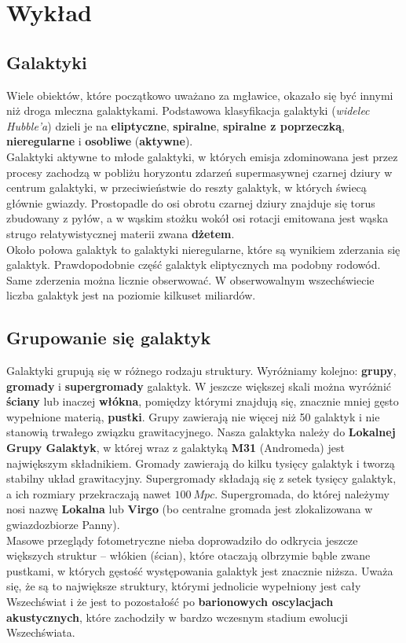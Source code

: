 \documentclass[../index.tex]{subfiles}
\begin{document}
    \section{Wykład}
        \subsection{Galaktyki}
            Wiele obiektów, które początkowo uważano za mgławice, okazało się być innymi niż droga mleczna galaktykami. Podstawowa klasyfikacja galaktyki (\textit{widelec Hubble'a}) dzieli je na \textbf{eliptyczne}, \textbf{spiralne}, \textbf{spiralne z poprzeczką}, \textbf{nieregularne} i \textbf{osobliwe} (\textbf{aktywne}).\\
            Galaktyki aktywne to młode galaktyki, w których emisja zdominowana jest przez procesy zachodzą w pobliżu horyzontu zdarzeń supermasywnej czarnej dziury w centrum galaktyki, w przeciwieństwie do reszty galaktyk, w których świecą głównie gwiazdy. Prostopadle do osi obrotu czarnej dziury znajduje się torus zbudowany z pyłów, a w wąskim stożku wokół osi rotacji emitowana jest wąska strugo relatywistycznej materii zwana \textbf{dżetem}.\\
            Około połowa galaktyk to galaktyki nieregularne, które są wynikiem zderzania się galaktyk. Prawdopodobnie część galaktyk eliptycznych ma podobny rodowód.\\
            Same zderzenia można licznie obserwować. W obserwowalnym wszechświecie liczba galaktyk jest na poziomie kilkuset miliardów.
        \subsection{Grupowanie się galaktyk}
            Galaktyki grupują się w różnego rodzaju struktury. Wyróżniamy kolejno: \textbf{grupy}, \textbf{gromady} i \textbf{supergromady} galaktyk. W jeszcze większej skali można wyróżnić \textbf{ściany} lub inaczej \textbf{włókna}, pomiędzy którymi znajdują się, znacznie mniej gęsto wypełnione materią, \textbf{pustki}. Grupy zawierają nie więcej niż 50 galaktyk i nie stanowią trwałego związku grawitacyjnego. Nasza galaktyka należy do \textbf{Lokalnej Grupy Galaktyk}, w której wraz z galaktyką \textbf{M31} (Andromeda) jest największym składnikiem. Gromady zawierają do kilku tysięcy galaktyk i tworzą stabilny układ grawitacyjny. Supergromady składają się z setek tysięcy galaktyk, a ich rozmiary przekraczają nawet \(100\:Mpc\). Supergromada, do której należymy nosi nazwę \textbf{Lokalna} lub \textbf{Virgo} (bo centralne gromada jest zlokalizowana w gwiazdozbiorze Panny).\\
            Masowe przeglądy fotometryczne nieba doprowadziło do odkrycia jeszcze większych struktur – włókien (ścian), które otaczają olbrzymie bąble zwane pustkami, w których gęstość występowania galaktyk jest znacznie niższa. Uważa się, że są to największe struktury, którymi jednolicie wypełniony jest cały Wszechświat i że jest to pozostałość po \textbf{barionowych oscylacjach akustycznych}, które zachodziły w bardzo wczesnym stadium ewolucji Wszechświata.
\end{document}
